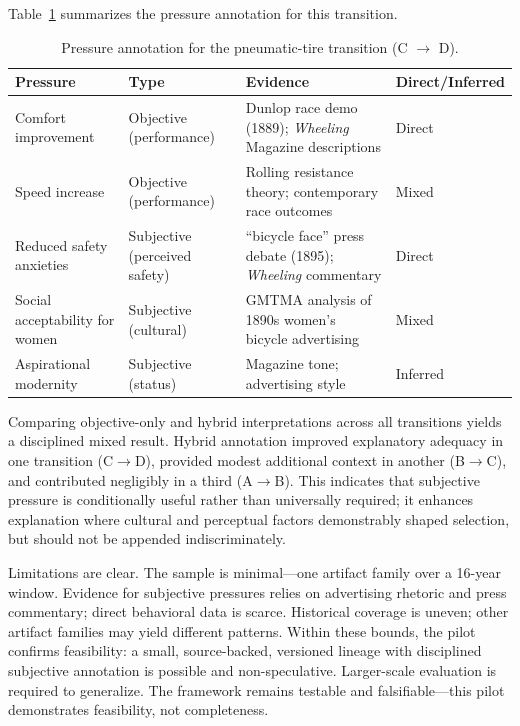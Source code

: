 Table~\ref{tab:pilot-pressures} summarizes the pressure annotation for this transition.

\begin{table}[ht]
\centering
\caption{Pressure annotation for the pneumatic-tire transition (C $\rightarrow$ D).}
\label{tab:pilot-pressures}

\begin{tabularx}{\textwidth}{l l X l}
\toprule
\textbf{Pressure} & \textbf{Type} & \textbf{Evidence} & \textbf{Direct/Inferred} \\
\midrule
Comfort improvement & Objective (performance) & Dunlop race demo (1889); \textit{Wheeling} Magazine descriptions & Direct \\
Speed increase & Objective (performance) & Rolling resistance theory; contemporary race outcomes & Mixed \\
Reduced safety anxieties & Subjective (perceived safety) & ``bicycle face'' press debate (1895); \textit{Wheeling} commentary & Direct \\
Social acceptability for women & Subjective (cultural) & GMTMA analysis of 1890s women's bicycle advertising & Mixed \\
Aspirational modernity & Subjective (status) & Magazine tone; advertising style & Inferred \\
\bottomrule
\end{tabularx}

\end{table}

Comparing objective-only and hybrid interpretations across all transitions yields a disciplined mixed result. Hybrid annotation improved explanatory adequacy in one transition (C\(\rightarrow\)D), provided modest additional context in another (B\(\rightarrow\)C), and contributed negligibly in a third (A\(\rightarrow\)B). This indicates that subjective pressure is conditionally useful rather than universally required; it enhances explanation where cultural and perceptual factors demonstrably shaped selection, but should not be appended indiscriminately.

Limitations are clear. The sample is minimal---one artifact family over a 16-year window. Evidence for subjective pressures relies on advertising rhetoric and press commentary; direct behavioral data is scarce. Historical coverage is uneven; other artifact families may yield different patterns. Within these bounds, the pilot confirms feasibility: a small, source-backed, versioned lineage with disciplined subjective annotation is possible and non-speculative. Larger-scale evaluation is required to generalize. The framework remains testable and falsifiable---this pilot demonstrates feasibility, not completeness.

